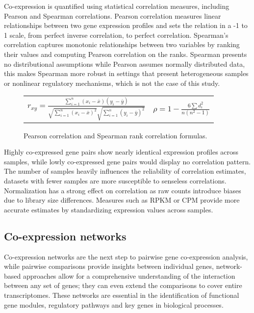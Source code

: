 \documentclass[
]{article}
\begin{document}
Co-expression is quantified using statistical correlation measures,
including Pearson and Spearman correlations. Pearson correlation
measures linear relationships between two gene expression profiles and
sets the relation in a -1 to 1 scale, from perfect inverse correlation,
to perfect correlation. Spearman's correlation captures monotonic
relationships between two variables by ranking their values and
computing Pearson correlation on the ranks. Spearman presents no
distributional assumptions while Pearson assumes normally distributed
data, this makes Spearman more robust in settings that present
heterogeneous samples or nonlinear regulatory mechanisms, which is not
the case of this study.

\begin{figure}[H]
    \centering
    \renewcommand{\arraystretch}{2} %
    \begin{tabular}{cc}
        $
        r_{xy} = \frac{\sum\limits_{i=1}^{n} (x_i - \overline{x})(y_i - \overline{y})}
        {\sqrt{\sum\limits_{i=1}^{n} (x_i - \overline{x})^2} \sqrt{\sum\limits_{i=1}^{n} (y_i - \overline{y})^2}}
        $ 
        &
        $
        \rho = 1 - \frac{6\sum d_i^2}{n(n^2 - 1)}
        $
    \end{tabular}
    \caption{\small Pearson correlation and Spearman rank correlation formulas.}
    \label{fig:correlation_formulas}
\end{figure}

Highly co-expressed gene pairs show nearly identical expression profiles
across samples, while lowly co-expressed gene pairs would display no
correlation pattern. The number of samples heavily influences the
reliability of correlation estimates, datasets with fewer samples are
more susceptible to senseless correlations. Normalization has a strong
effect on correlation as raw counts introduce biases due to library size
differences. Measures such as RPKM or CPM provide more accurate
estimates by standardizing expression values across samples.

\hypertarget{co-expression-networks}{%
\subsection{Co-expression networks}\label{co-expression-networks}}

Co-expression networks are the next step to pairwise gene co-expression
analysis, while pairwise comparisons provide insights between individual
genes, network-based approaches allow for a comprehensive understanding
of the interaction between any set of genes; they can even extend the
comparisons to cover entire transcriptomes. These networks are essential
in the identification of functional gene modules, regulatory pathways
and key genes in biological processes.
\end{document}

